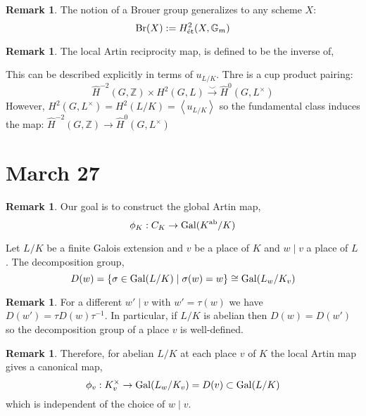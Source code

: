\documentclass[12pt]{extarticle}
\newcommand{\divides}{\mid}
\newcommand{\Z}{\mathbb{Z}}
\theoremstyle{definition}
\newtheorem{remark}[theorem]{Remark}
\newenvironment{definition}[1][Definition:]{\begin{trivlist}
\item[\hskip \labelsep {\bfseries #1}]}{\end{trivlist}}
\begin{document}
\begin{remark}
The notion of a Brouer group generalizes to any scheme $X$:
\[ \mathrm{Br}(X) : = H^2_{\text{\'{e}t}}(X, \mathbb{G}_m) \]
\end{remark}

\begin{remark}
The local Artin reciprocity map, is defined to be the inverse of,
\begin{center}
\end{center}
This can be described explicitly in terms of $u_{L/K}$. Thre is a cup product pairing:
\[ \hat{H}^{-2}(G, \Z) \times H^2(G, L) \xrightarrow{\smile} \hat{H}^0(G, L^\times) \]
However, $H^2(G, L^\times) = H^2(L / K) = \left< u_{L/K} \right>$ so the fundamental class induces the map: $\hat{H}^{-2}(G, \Z) \to \hat{H}^0(G, L^\times)$
\end{remark}

\section{March 27}

\begin{remark}
Our goal is to construct the global Artin map,
\[ \phi_K : C_K \to \mathrm{Gal} (K^{\text{ab}} / K) \]
\end{remark}

\begin{definition}
Let $L / K$ be a finite Galois extension and $v$ be a place of $K$ and $w \divides v$ a place of $L$. The decomposition group,
\[ D(w) = \{ \sigma \in \mathrm{Gal} (L/K) \mid \sigma(w) = w \} \cong \mathrm{Gal} (L_w / K_v) \]
\end{definition}

\begin{remark}
For a different $w' \divides v$ with $w' = \tau(w)$ we have $D(w') = \tau D(w) \tau^{-1}$. In particular, if $L / K$ is abelian then $D(w) = D(w')$ so the decomposition group of a place $v$ is well-defined. 
\end{remark}

\begin{remark}
Therefore, for abelian $L / K$ at each place $v$ of $K$ the local Artin map gives a canonical map,
\[ \phi_v : K_v^\times \to \mathrm{Gal} (L_w/K_v) = D(v) \subset \mathrm{Gal} (L/K) \]
which is independent of the choice of $w \divides v$. 
\end{remark}
\end{document}
